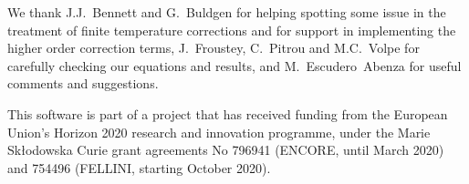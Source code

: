 \documentclass[notitlepage,nofootinbib,showpacs,preprintnumbers,amsmath,amssymb,superscriptaddress,prd,onecolumn]{revtex4-1}
\begin{document}
\acknowledgments
We thank J.J.~Bennett and G.~Buldgen for helping spotting
some issue in the treatment of finite temperature corrections
and for support in implementing the higher order correction terms,
J.~Froustey, C.~Pitrou and M.C.~Volpe for carefully checking our equations and results,
and M.~Escudero~Abenza for useful comments and suggestions.

This software is part of a project that has received funding from the European Union's Horizon 2020 research and innovation programme, under the Marie Sk{\l}odowska Curie grant agreements No
796941 (ENCORE, until March 2020) and
754496 (FELLINI, starting October 2020).




\end{document}
